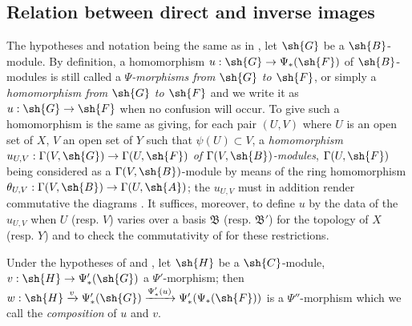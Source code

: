 \subsection{Relation between direct and inverse images}
\label{subsection:0.4.4}

\begin{env}[4.4.1]
\label{0.4.4.1}
The hypotheses and notation being the same as in , let
$\sh{G}$ be a $\sh{B}$-module. By definition, a homomorphism
$u:\sh{G}\to\Psi_*(\sh{F})$ of $\sh{B}$-modules is still called a
\emph{$\Psi$-morphisms from $\sh{G}$ to $\sh{F}$}, or simply a
\emph{homomorphism from $\sh{G}$ to $\sh{F}$} and we write it as
$u:\sh{G}\to\sh{F}$ when no confusion will occur. To give such a homomorphism is
the same as giving, for each pair $(U,V)$ where $U$ is an open set of $X$, $V$
an open set of $Y$ such that $\psi(U)\subset V$, a \emph{homomorphism
$u_{U,V}:\Gamma(V,\sh{G})\to\Gamma(U,\sh{F})$ of $\Gamma(V,\sh{B})$-modules},
$\Gamma(U,\sh{F})$ being considered as a $\Gamma(V,\sh{B})$-module by means of
the ring homomorphism $\theta_{U,V}:\Gamma(V,\sh{B})\to\Gamma(U,\sh{A})$; the
$u_{U,V}$ must in addition render commutative the diagrams . It
suffices, moreover, to define $u$ by the data of the $u_{U,V}$ when $U$
(resp. $V$) varies over a basis $\mathfrak{B}$ (resp. $\mathfrak{B}'$) for the
topology of $X$ (resp. $Y$) and to check the commutativity of  for
these restrictions.
\end{env}

\begin{env}[4.4.2]
\label{0.4.4.2}
Under the hypotheses of  and , let $\sh{H}$ be
a $\sh{C}$-module, $v:\sh{H}\to\Psi_*'(\sh{G})$ a $\Psi'$-morphism; then
$w:\sh{H}\xrightarrow{v}\Psi_*'(\sh{G})\xrightarrow{\Psi_*'(u)}\Psi_*'(\Psi_*(\sh{F}))$
is a $\Psi''$-morphism which we call the \emph{composition} of $u$ and $v$.
\end{env}

